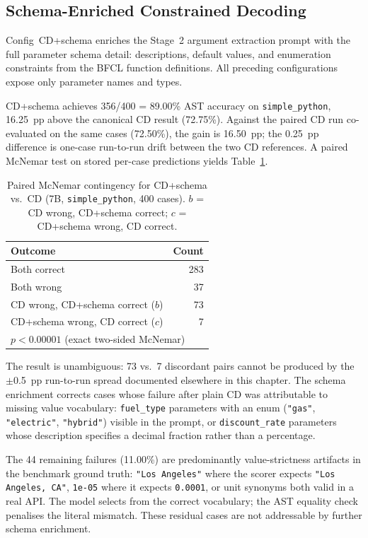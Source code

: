 \subsection{Schema-Enriched Constrained Decoding}
\label{sec:cd-schema}

Config~CD+schema enriches the Stage~2 argument extraction prompt with
the full parameter schema detail: descriptions, default values, and
enumeration constraints from the BFCL function definitions.
All preceding configurations expose only parameter names and types.

CD+schema achieves 356/400 = 89.00\% AST accuracy on
\texttt{simple\_python}, 16.25~pp above the canonical CD result
(72.75\%). Against the paired CD run co-evaluated on the same cases
(72.50\%), the gain is 16.50~pp; the 0.25~pp difference is one-case
run-to-run drift between the two CD references.
A paired McNemar test on stored per-case
predictions yields Table~\ref{tab:mcnemar-schema}.

\begin{table}[ht]
\centering
\caption{Paired McNemar contingency for CD+schema vs.\ CD (7B,
         \texttt{simple\_python}, 400 cases).
         $b$ = CD wrong, CD+schema correct;
         $c$ = CD+schema wrong, CD correct.}
\label{tab:mcnemar-schema}
\begin{tabular}{lr}
\toprule
Outcome & Count \\
\midrule
Both correct              & 283 \\
Both wrong                & 37  \\
CD wrong, CD+schema correct ($b$) & 73  \\
CD+schema wrong, CD correct ($c$) & 7   \\
\midrule
\multicolumn{2}{l}{$p < 0.00001$ (exact two-sided McNemar)} \\
\bottomrule
\end{tabular}
\end{table}

\noindent The result is unambiguous: 73 vs.\ 7 discordant pairs
cannot be produced by the $\pm$0.5~pp run-to-run spread documented
elsewhere in this chapter. The schema enrichment corrects cases whose
failure after plain CD was attributable to missing value vocabulary:
\texttt{fuel\_type} parameters with an enum (\texttt{"gas"},
\texttt{"electric"}, \texttt{"hybrid"}) visible in the prompt, or
\texttt{discount\_rate} parameters whose description specifies a
decimal fraction rather than a percentage.

The 44 remaining failures (11.00\%) are predominantly
value-strictness artifacts in the benchmark ground truth:
\texttt{"Los Angeles"} where the scorer expects
\texttt{"Los Angeles, CA"}, \texttt{1e-05} where it expects
\texttt{0.0001}, or unit synonyms both valid in a real API.
The model selects from the correct vocabulary; the AST equality
check penalises the literal mismatch. These residual cases are not
addressable by further schema enrichment.

